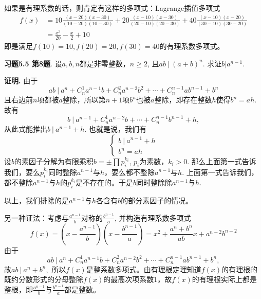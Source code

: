 如果是有理系数的话，则肯定有这样的多项式：Lagrange插值多项式
\begin{align*}
f(x) & = 10\frac{(x-20)(x-30)}{(10-20)(10-30)} + 20\frac{(x-10)(x-30)}{(20-10)(20-30)} + 40\frac{(x-10)(x-20)}{(30-10)(30-20)} \\
& = \frac{x^2}{20} - \frac{x}{2} + 10
\end{align*}
即是满足$f(10)=10, f(20)=20, f(30)=40$的有理系数多项式。


\newpageorvspace


{\bf 习题5.5 第8题}. 设$a,b,n$都是非零整数，$n\geqslant 2$, 且$ab\ |\ (a+b)^n$. 求证$b|a^{n-1}$.

{\bf 证明.} 由于
$$ab\ |\ a^n + C_n^1a^{n-1}b + C_n^2a^{n-2}b^2 + \cdots + C_n^{n-1}ab^{n-1} + b^n$$
且右边前$n$项都被$a$整除，所以第$n+1$项$b^n$也被$a$整除，即存在整数$h$使得$b^n = ah$. 故有
$$b\ |\ a^{n-1} + C_n^1a^{n-2}b + \cdots + C_n^{n-1}b^{n-1} + h,$$
从此式能推出$b\ |\ a^{n-1} + h$. 也就是说，我们有
$$
\begin{cases}
b\ |\ a^{n-1} + h \\
b^n = ah
\end{cases}
$$
设$b$的素因子分解为有限乘积$b = \pm \prod p_i^{k_i}$, $p_i$为素数，$k_i>0$. 那么上面第一式告诉我们，要么$p_i^{k_i}$同时整除$a^{n-1}$与$h$，要么都不整除$a^{n-1}$与$h$. 上面第一式告诉我们，都不整除$a^{n-1}$与$h$的$p_i^{k_i}$是不存在的。于是$b$同时整除除$a^{n-1}$与$h$.

以上，我们排除的是$a^{n-1}$与$h$各含有$b$的部分素因子的情况。

另一种证法：考虑与$\frac{a^{n-1}}{b}$对称的$\frac{b^{n-1}}{a}$, 并构造有理系数多项式
$$f(x) = \left(x-\frac{a^{n-1}}{b}\right) \left(x-\frac{b^{n-1}}{a}\right) = x^2 + \frac{a^n+b^n}{ab} x + a^{n-2}b^{n-2}$$
由于
$$ab\ |\ a^n + C_n^1a^{n-1}b + C_n^2a^{n-2}b^2 + \cdots + C_n^{n-1}ab^{n-1} + b^n,$$
故$ab\ |\ a^n + b^n,$ 所以$f(x)$是整系数多项式。由有理根定理知道$f(x)$的有理根的既约分数形式的分母整除$f(x)$的最高次项系数1，故$f(x)$的有理根实际上都是整根，即$\frac{a^{n-1}}{b}$与$\frac{b^{n-1}}{a}$都是整数。



